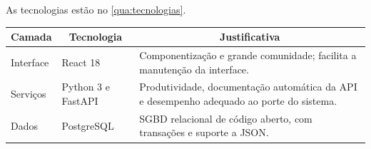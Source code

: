 \documentclass[12pt, a4paper, brazilian]{abntex2}
\begin{document}
As tecnologias estão no \autoref{qua:tecnologias}.

\begin{quadro}[htbp]
  \caption{Tecnologias empregadas e justificativas (exemplo)}\label{qua:tecnologias}
  \small
  \renewcommand{\arraystretch}{1.25}
  \begin{tabularx}{\textwidth}{|l|l|X|}
    \hline
    \multicolumn{1}{|c|}{\textbf{Camada}} & \multicolumn{1}{c|}{\textbf{Tecnologia}} & \multicolumn{1}{c|}{\textbf{Justificativa}} \\
    \hline
    Interface & React 18 & Componentização e grande comunidade; facilita a manutenção da interface. \\
    \hline
    Serviços & Python 3 e FastAPI & Produtividade, documentação automática da API e desempenho adequado ao porte do sistema. \\
    \hline
    Dados & PostgreSQL & SGBD relacional de código aberto, com transações e suporte a JSON. \\
    \hline
  \end{tabularx}
\end{quadro}
\end{document}
